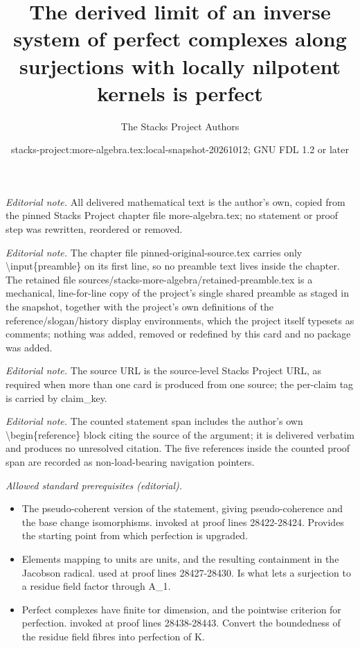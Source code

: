 \documentclass[10pt,a4paper]{amsart}
\title{The derived limit of an inverse system of perfect complexes along surjections with locally nilpotent kernels is perfect}
\author{The Stacks Project Authors}
\date{stacks-project:more-algebra.tex:local-snapshot-20261012; GNU FDL 1.2 or later}
\theoremstyle{plain}
\theoremstyle{definition}
\theoremstyle{remark}
\numberwithin{equation}{subsection}
\begin{document}
\maketitle
\setcounter{subsection}{1}
\noindent\textit{Editorial note.} All delivered mathematical text is the author's own, copied from the pinned Stacks Project chapter file more-algebra.tex; no statement or proof step was rewritten, reordered or removed.\par\medskip
\noindent\textit{Editorial note.} The chapter file pinned-original-source.tex carries only \textbackslash{}input\{preamble\} on its first line, so no preamble text lives inside the chapter. The retained file sources/stacks-more-algebra/retained-preamble.tex is a mechanical, line-for-line copy of the project's single shared preamble as staged in the snapshot, together with the project's own definitions of the reference/slogan/history display environments, which the project itself typesets as comments; nothing was added, removed or redefined by this card and no package was added.\par\medskip
\noindent\textit{Editorial note.} The source URL is the source-level Stacks Project URL, as required when more than one card is produced from one source; the per-claim tag is carried by claim\_key.\par\medskip
\noindent\textit{Editorial note.} The counted statement span includes the author's own \textbackslash{}begin\{reference\} block citing the source of the argument; it is delivered verbatim and produces no unresolved citation. The five references inside the counted proof span are recorded as non-load-bearing navigation pointers.\par\medskip
\noindent\textit{Allowed standard prerequisites (editorial).}\begin{itemize}
\item The pseudo-coherent version of the statement, giving pseudo-coherence and the base change isomorphisms. invoked at proof lines 28422-28424. Provides the starting point from which perfection is upgraded.
\item Elements mapping to units are units, and the resulting containment in the Jacobson radical. used at proof lines 28427-28430. Is what lets a surjection to a residue field factor through A\_1.
\item Perfect complexes have finite tor dimension, and the pointwise criterion for perfection. invoked at proof lines 28438-28443. Convert the boundedness of the residue field fibres into perfection of K.
\end{itemize}\medskip
\end{document}
